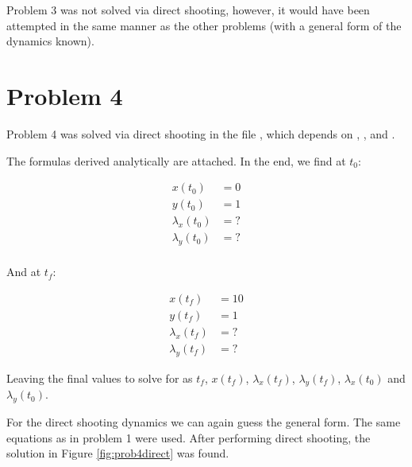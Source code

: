 \documentclass[12pt,letterpaper]{article}
\begin{document}
Problem 3 was not solved via direct shooting, however, it would have been attempted in the same manner as the other problems (with a general form of the dynamics known).


\section*{Problem 4}

Problem 4 was solved via direct shooting in the file , which depends on , , and .

The formulas derived analytically are attached. In the end, we find at $t_0$:

\begin{equation}
\begin{aligned}
\label{eq:2}
x(t_0) &= 0 \\
y(t_0) &= 1 \\
\lambda_x(t_0) &= ? \\
\lambda_y(t_0) &= ? \\
\end{aligned}
\end{equation}

And at $t_f$:

\begin{equation}
\begin{aligned}
\label{eq:2}
x(t_f) &= 10 \\
y(t_f) &= 1 \\
\lambda_x(t_f) &= ? \\
\lambda_y(t_f) &= ? 
\end{aligned}
\end{equation}

Leaving the final values to solve for as $t_f$, $x(t_f)$, $\lambda_x(t_f)$, $\lambda_y(t_f)$, $\lambda_x(t_0)$ and $\lambda_y(t_0)$.

For the direct shooting dynamics we can again guess the general form. The same equations as in problem 1 were used. After performing direct shooting, the solution in Figure \ref{fig:prob4direct} was found.


\clearpage
\end{document}
